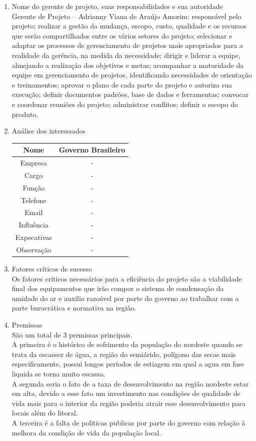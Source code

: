 \begin{enumerate}
\item Nome do gerente de projeto, suas responsabilidades e sua autoridade\\
Gerente de Projeto – Adrianny Viana de Araújo Amorim: responsável pelo projeto; realizar a gestão da mudança, escopo, custo, qualidade e os recursos que serão compartilhados entre os vários setores do projeto; selecionar e adaptar os processos de gerenciamento de projetos mais apropriados para a realidade da gerência, na medida da necessidade; dirigir e liderar a equipe, almejando a realização dos objetivos e metas; acompanhar a maturidade da equipe em gerenciamento de projetos, identificando necessidades de orientação e treinamentos; aprovar o plano de cada parte do projeto e autoriza sua execução; definir documentos padrões, base de dados e ferramentas; convocar e coordenar reuniões do projeto; administrar conflitos; definir o escopo do produto.

\item Análise dos interessados
\begin{table}[!h]
\centering
\begin{tabular}{|c|c|}
Nome & Governo Brasileiro\\
\hline                               
Empresa & - \\ \hline 
Cargo & - \\ \hline 
Função & - \\ \hline 
Telefone & - \\ \hline 
Email & - \\ \hline 
Influência & - \\ \hline 
Expecativas & - \\ \hline 
Observação & - \\ \hline 

\end{tabular}
\end{table}
\FloatBarrier
\item Fatores críticos de sucesso\\
Os fatores críticos necessários para a eficiência do projeto são a viabilidade final dos equipamentos que irão compor o sistema de condensação da umidade do ar e auxilio razoável por parte do governo ao trabalhar com a parte burocrática e normativa na região.

\item Premissas\\
São um total de 3 premissas principais.\\
	A primeira é o histórico de sofrimento da população do nordeste quando se trata da escassez de água, a região do semiárido, polígono das secas mais especificamente, possui longos períodos de estiagem em qual a agua em fase liquida se torna muito escassa.\\
	A segunda seria o fato de a taxa de desenvolvimento na região nordeste estar em alta, devido a esse fato um investimento nas condições de qualidade de vida mais para o interior da região poderia atrair esse desenvolvimento para locais além do litoral.\\
	A terceira é a falta de politicas publicas por parte do governo com relação à melhora da condição de vida da população local. \\


\end{enumerate}
